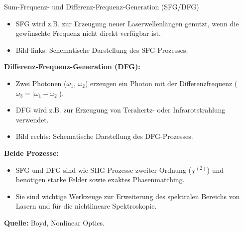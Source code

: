 \documentclass[notes=only]{beamer}
\begin{document}
\begin{frame}{Sum-Frequenz- und Differenz-Frequenz-Generation (SFG/DFG)}
{\begin{itemize}
      \item SFG wird z.B. zur Erzeugung neuer Laserwellenlängen genutzt, wenn die gewünschte Frequenz nicht direkt verfügbar ist.
      \item Bild links: Schematische Darstellung des SFG-Prozesses.
    \end{itemize}
    \textbf{Differenz-Frequenz-Generation (DFG):}
    \begin{itemize}
      \item Zwei Photonen ($\omega_1$, $\omega_2$) erzeugen ein Photon mit der Differenzfrequenz ($\omega_3 = |\omega_1 - \omega_2|$).
      \item DFG wird z.B. zur Erzeugung von Terahertz- oder Infrarotstrahlung verwendet.
      \item Bild rechts: Schematische Darstellung des DFG-Prozesses.
    \end{itemize}
    \textbf{Beide Prozesse:}
    \begin{itemize}
      \item SFG und DFG sind wie SHG Prozesse zweiter Ordnung ($\chi^{(2)}$) und benötigen starke Felder sowie exaktes Phasenmatching.
      \item Sie sind wichtige Werkzeuge zur Erweiterung des spektralen Bereichs von Lasern und für die nichtlineare Spektroskopie.
    \end{itemize}
    \textbf{Quelle:} Boyd, Nonlinear Optics.
  }
\end{frame}
\end{document}
